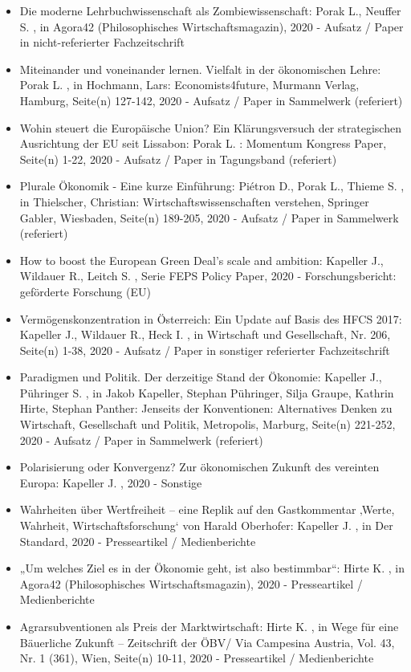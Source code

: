 \begin{itemize}
	 \item Die moderne Lehrbuchwissenschaft als Zombiewissenschaft: Porak L., Neuffer S. , in Agora42 (Philosophisches Wirtschaftsmagazin), 2020 - Aufsatz / Paper in nicht-referierter Fachzeitschrift
	 \item Miteinander und voneinander lernen. Vielfalt in der ökonomischen Lehre: Porak L. , in Hochmann, Lars: Economists4future, Murmann Verlag, Hamburg, Seite(n) 127-142, 2020 - Aufsatz / Paper in Sammelwerk (referiert)
	 \item Wohin steuert die Europäische Union? Ein Klärungsversuch der strategischen Ausrichtung der EU seit Lissabon: Porak L. : Momentum Kongress Paper, Seite(n) 1-22, 2020 - Aufsatz / Paper in Tagungsband (referiert)
	 \item Plurale Ökonomik - Eine kurze Einführung: Piétron D., Porak L., Thieme S. , in Thielscher, Christian: Wirtschaftswissenschaften verstehen, Springer Gabler, Wiesbaden, Seite(n) 189-205, 2020 - Aufsatz / Paper in Sammelwerk (referiert)
	 \item How to boost the European Green Deal’s scale and ambition: Kapeller J., Wildauer R., Leitch S. , Serie FEPS Policy Paper, 2020 - Forschungsbericht: geförderte Forschung (EU)
	 \item Vermögenskonzentration in Österreich: Ein Update auf Basis des HFCS 2017: Kapeller J., Wildauer R., Heck I. , in Wirtschaft und Gesellschaft, Nr. 206, Seite(n) 1-38, 2020 - Aufsatz / Paper in sonstiger referierter Fachzeitschrift
	 \item Paradigmen und Politik. Der derzeitige Stand der Ökonomie: Kapeller J., Pühringer S. , in Jakob Kapeller, Stephan Pühringer, Silja Graupe, Kathrin Hirte, Stephan Panther: Jenseits der Konventionen: Alternatives Denken zu Wirtschaft, Gesellschaft und Politik, Metropolis, Marburg, Seite(n) 221-252, 2020 - Aufsatz / Paper in Sammelwerk (referiert)
	 \item Polarisierung oder Konvergenz? Zur ökonomischen Zukunft des vereinten Europa: Kapeller J. , 2020 - Sonstige
	 \item Wahrheiten über Wertfreiheit – eine Replik auf den Gastkommentar ‚Werte, Wahrheit, Wirtschaftsforschung‘ von Harald Oberhofer: Kapeller J. , in Der Standard, 2020 - Presseartikel / Medienberichte
	 \item „Um welches Ziel es in der Ökonomie geht, ist also bestimmbar“: Hirte K. , in Agora42 (Philosophisches Wirtschaftsmagazin), 2020 - Presseartikel / Medienberichte
	 \item Agrarsubventionen als Preis der Marktwirtschaft: Hirte K. , in Wege für eine Bäuerliche Zukunft – Zeitschrift der ÖBV/ Via Campesina Austria, Vol. 43, Nr. 1 (361), Wien, Seite(n) 10-11, 2020 - Presseartikel / Medienberichte

\end{itemize}
